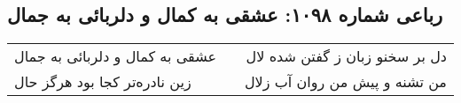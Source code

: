 \begin{center}
\section*{رباعی شماره ۱۰۹۸: عشقی به کمال و دلربائی به جمال}
\label{sec:1098}
\begin{longtable}{l p{0.5cm} r}
عشقی به کمال و دلربائی به جمال
&&
دل بر سخنو زبان ز گفتن شده لال
\\
زین نادره‌تر کجا بود هرگز حال
&&
من تشنه و پیش من روان آب زلال
\\
\end{longtable}
\end{center}
